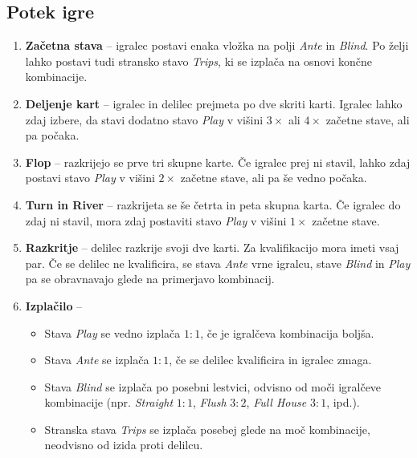 \documentclass[a4paper,12pt]{article}
\begin{document}
\subsection*{Potek igre}
\begin{enumerate}
    \item \textbf{Začetna stava} -- igralec postavi enaka vložka na polji \emph{Ante} in \emph{Blind}. 
    Po želji lahko postavi tudi stransko stavo \emph{Trips}, ki se izplača na osnovi končne kombinacije.
    
    \item \textbf{Deljenje kart} -- igralec in delilec prejmeta po dve skriti karti. 
    Igralec lahko zdaj izbere, da stavi dodatno stavo \emph{Play} v višini $3\times$ ali $4\times$ 
    začetne stave, ali pa počaka.
    
    \item \textbf{Flop} -- razkrijejo se prve tri skupne karte. Če igralec prej ni stavil, 
    lahko zdaj postavi stavo \emph{Play} v višini $2\times$ začetne stave, ali pa še vedno počaka.
    
    \item \textbf{Turn in River} -- razkrijeta se še četrta in peta skupna karta. 
    Če igralec do zdaj ni stavil, mora zdaj postaviti stavo \emph{Play} v višini $1\times$ začetne stave.
    
    \item \textbf{Razkritje} -- delilec razkrije svoji dve karti. 
    Za kvalifikacijo mora imeti vsaj par. Če se delilec ne kvalificira, se stava \emph{Ante} vrne igralcu, 
    stave \emph{Blind} in \emph{Play} pa se obravnavajo glede na primerjavo kombinacij.
    
    \item \textbf{Izplačilo} -- 
    \begin{itemize}
        \item Stava \emph{Play} se vedno izplača $1:1$, če je igralčeva kombinacija boljša.
        \item Stava \emph{Ante} se izplača $1:1$, če se delilec kvalificira in igralec zmaga.
        \item Stava \emph{Blind} se izplača po posebni lestvici, odvisno od moči igralčeve kombinacije (npr. \emph{Straight} $1:1$, \emph{Flush} $3:2$, \emph{Full House} $3:1$, ipd.).
        \item Stranska stava \emph{Trips} se izplača posebej glede na moč kombinacije, neodvisno od izida proti delilcu.
    \end{itemize}
\end{enumerate}
\end{document}
